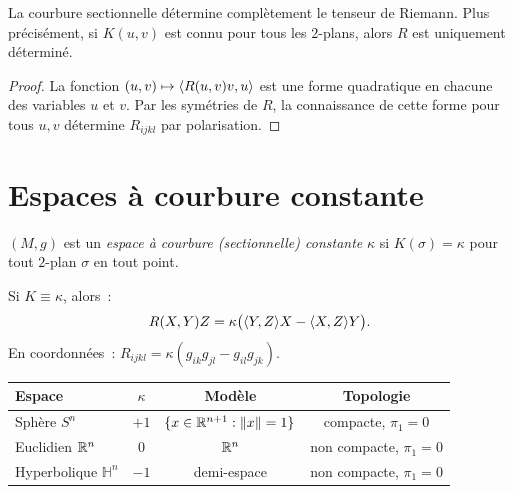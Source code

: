 \begin{theoreme}
La courbure sectionnelle d\'etermine compl\`etement le tenseur de Riemann.
Plus pr\'ecis\'ement, si $K(u,v)$ est connu pour tous les $2$-plans, alors
$R$ est uniquement d\'etermin\'e.
\end{theoreme}

\begin{proof}
La fonction $(u,v) \mapsto \langle R(u,v)v, u \rangle$ est une forme quadratique en
chacune des variables $u$ et $v$. Par les sym\'etries de $R$, la connaissance
de cette forme pour tous $u, v$ d\'etermine $R_{ijkl}$ par polarisation.
\end{proof}

\section{Espaces \`a courbure constante}

\begin{definition}
$(M, g)$ est un \emph{espace \`a courbure (sectionnelle) constante} $\kappa$ si
$K(\sigma) = \kappa$ pour tout $2$-plan $\sigma$ en tout point.
\end{definition}

\begin{theoreme}
Si $K \equiv \kappa$, alors~:
\[
    R(X,Y)Z = \kappa\big(\langle Y, Z \rangle X - \langle X, Z \rangle Y\big).
\]
En coordonn\'ees~: $R_{ijkl} = \kappa(g_{ik}g_{jl} - g_{il}g_{jk})$.
\end{theoreme}

\begin{formules}[title=\textbf{Espaces \`a courbure constante}]
\begin{center}
\renewcommand{\arraystretch}{1.3}
\begin{tabular}{lccc}
\hline
\textbf{Espace} & $\kappa$ & \textbf{Mod\`ele} & \textbf{Topologie} \\
\hline
Sph\`ere $S^n$ & $+1$ & $\{x \in \mathbb{R}^{n+1} : \left\| x \right\| = 1\}$ & compacte, $\pi_1 = 0$ \\
Euclidien $\mathbb{R}^n$ & $0$ & $\mathbb{R}^n$ & non compacte, $\pi_1 = 0$ \\
Hyperbolique $\mathbb{H}^n$ & $-1$ & demi-espace & non compacte, $\pi_1 = 0$ \\
\hline
\end{tabular}
\end{center}
\end{formules}


